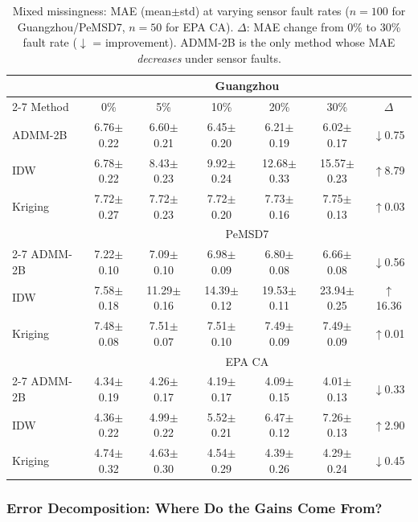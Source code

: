\documentclass[journal]{IEEEtran}
\begin{document}
\begin{table}[htbp]
  \centering
  \caption{Mixed missingness: MAE (mean$\pm$std) at varying sensor fault rates ($n{=}100$ for Guangzhou/PeMSD7, $n{=}50$ for EPA CA). $\Delta$: MAE change from 0\% to 30\% fault rate ($\downarrow$ = improvement). ADMM-2B is the only method whose MAE \emph{decreases} under sensor faults.}
  \label{tab:fault}
  \small
  \setlength{\tabcolsep}{2.5pt}
  \begin{tabular}{lcccccc}
    \toprule
    & \multicolumn{6}{c}{Guangzhou} \\
    \cmidrule(lr){2-7}
    Method & 0\% & 5\% & 10\% & 20\% & 30\% & $\Delta$ \\
    \midrule
    ADMM-2B & 6.76$\pm$0.22 & 6.60$\pm$0.21 & 6.45$\pm$0.20 & 6.21$\pm$0.19 & 6.02$\pm$0.17 & $\downarrow$0.75 \\
    IDW & 6.78$\pm$0.22 & 8.43$\pm$0.23 & 9.92$\pm$0.24 & 12.68$\pm$0.33 & 15.57$\pm$0.23 & $\uparrow$8.79 \\
    Kriging & 7.72$\pm$0.27 & 7.72$\pm$0.23 & 7.72$\pm$0.20 & 7.73$\pm$0.16 & 7.75$\pm$0.13 & $\uparrow$0.03 \\
    \midrule
    & \multicolumn{6}{c}{PeMSD7} \\
    \cmidrule(lr){2-7}
    ADMM-2B & 7.22$\pm$0.10 & 7.09$\pm$0.10 & 6.98$\pm$0.09 & 6.80$\pm$0.08 & 6.66$\pm$0.08 & $\downarrow$0.56 \\
    IDW & 7.58$\pm$0.18 & 11.29$\pm$0.16 & 14.39$\pm$0.12 & 19.53$\pm$0.11 & 23.94$\pm$0.25 & $\uparrow$16.36 \\
    Kriging & 7.48$\pm$0.08 & 7.51$\pm$0.07 & 7.51$\pm$0.10 & 7.49$\pm$0.09 & 7.49$\pm$0.09 & $\uparrow$0.01 \\
    \midrule
    & \multicolumn{6}{c}{EPA CA} \\
    \cmidrule(lr){2-7}
    ADMM-2B & 4.34$\pm$0.19 & 4.26$\pm$0.17 & 4.19$\pm$0.17 & 4.09$\pm$0.15 & 4.01$\pm$0.13 & $\downarrow$0.33 \\
    IDW & 4.36$\pm$0.22 & 4.99$\pm$0.22 & 5.52$\pm$0.21 & 6.47$\pm$0.12 & 7.26$\pm$0.13 & $\uparrow$2.90 \\
    Kriging & 4.74$\pm$0.32 & 4.63$\pm$0.30 & 4.54$\pm$0.29 & 4.39$\pm$0.26 & 4.29$\pm$0.24 & $\downarrow$0.45 \\
    \bottomrule
  \end{tabular}
\end{table}

\subsubsection{Error Decomposition: Where Do the Gains Come From?}
\end{document}
